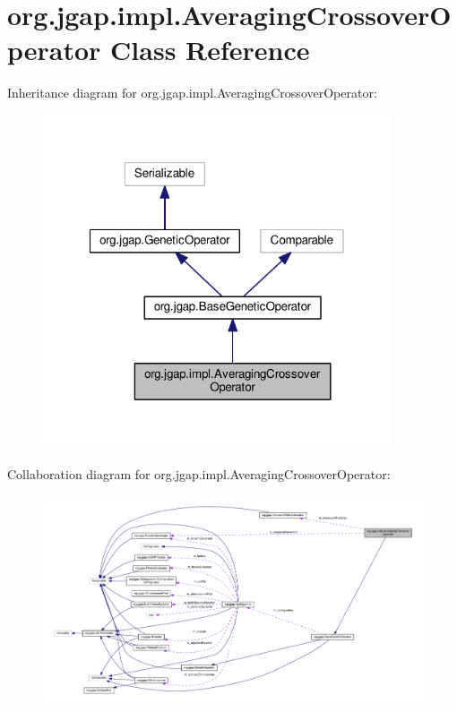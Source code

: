 \hypertarget{classorg_1_1jgap_1_1impl_1_1_averaging_crossover_operator}{\section{org.\-jgap.\-impl.\-Averaging\-Crossover\-Operator Class Reference}
\label{classorg_1_1jgap_1_1impl_1_1_averaging_crossover_operator}
}


Inheritance diagram for org.\-jgap.\-impl.\-Averaging\-Crossover\-Operator\-:
\nopagebreak
\begin{figure}[H]
\begin{center}
\leavevmode
\includegraphics[width=291pt]{classorg_1_1jgap_1_1impl_1_1_averaging_crossover_operator__inherit__graph}
\end{center}
\end{figure}


Collaboration diagram for org.\-jgap.\-impl.\-Averaging\-Crossover\-Operator\-:
\nopagebreak
\begin{figure}[H]
\begin{center}
\leavevmode
\includegraphics[width=350pt]{classorg_1_1jgap_1_1impl_1_1_averaging_crossover_operator__coll__graph}
\end{center}
\end{figure}

